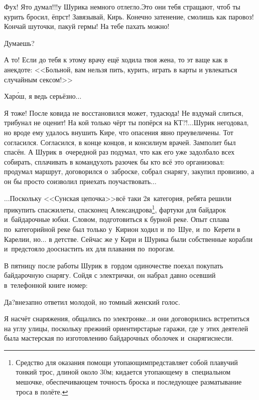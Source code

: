 \diagdash Фух! Я\sdash то думал!!!\mdash у Шурика немного отлегло.\mdash Это они тебя стращают, чтоб ты курить бросил, ёпрст! Завязывай, Кирь. Конечно затенение, смолишь как паровоз! Кончай шуточки, пакуй гермы! На тебе пахать можно!

\diagdash Думаешь?

\diagdash А то! Если до тебя к этому врачу ещё ходила твоя жена, то эт ваще как в анекдоте: <<Больной, вам нельзя пить, курить, играть в карты и увлекаться случайным сексом!>>

\diagdash Хар\'{о}ш, я ведь серьёзно$\ldots$

\diagdash Я тоже! После ковида не восстановился может, туда\sdash сюда! Не вздумай слиться, трибунал не оценит! На кой только чёрт ты попёрся на КТ?!$\ldots$\mdash Шурик негодовал, но вроде ему удалось внушить Кире, что опасения явно преувеличены. Тот согласился. Согласился, в конце концов, и консилиум врачей. Замполит был спасён. А Шурик в~очередной раз подумал, что как его уже задолбало всех собирать, сплачивать в команду\mdash хоть разочек бы кто всё это организовал: продумал маршрут, договорился о~заброске, собрал снарягу, закупил провизию, а он бы просто соизволил приехать поучаствовать$\ldots$

\vspace{0.5cm}
\renewcommand*{\thefootnote}{\fnsymbol{footnote}}
$\ldots$Поскольку <<Сунская цепочка>>\mdash всё таки 2\sdash я~категория, ребята решили прикупить спасжилеты, спасконец Александрова\footnote[1]{Средство для оказания помощи утопающим\mdash представляет собой плавучий тонкий трос, длиной около 30\thinspace м; кидается утопающему в~специальном мешочке, обеспечивающем точность броска и последующее разматывание троса в полёте.}, фартуки для байдарок и~байдарочные юбки. Словом, подготовиться к бурной реке. Опыт сплава по~категорийной реке был только у~Кири\mdash он ходил и~по~Шуе, и~по~Керети в Карелии, но$\ldots$ в детстве. Сейчас же у Кири и Шурика были собственные корабли и~предстояло дооснастить их для плавания по~порогам. 

В пятницу после работы Шурик в~гордом одиночестве поехал покупать байдарочную снарягу. Сойдя с электрички, он набрал давно осевший в~телефонной книге номер:

\diagdash Да?\mdash внезапно ответил молодой, но томный женский голос.%

\diagdash Я насчёт снаряжения, общались по электронке$\ldots$\mdash и они договорились встретиться на углу улицы, поскольку прежний ориентир\mdash старые гаражи, где у этих деятелей была мастерская по изготовлению байдарочных оболочек и~снаряги\mdash снесли.


